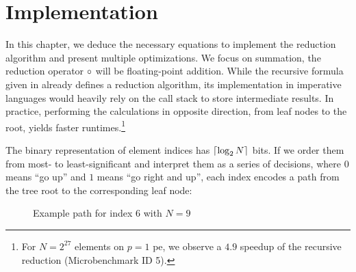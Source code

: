 \chapter{Implementation}
\label{ch:Implementation}

In this chapter, we deduce the necessary equations to implement the reduction algorithm and present multiple optimizations.
We focus on summation, the reduction operator $\operatorname{\circ}$ will be floating-point addition.
While the recursive formula given in  already defines a reduction algorithm, its implementation in imperative languages would heavily rely on the call stack to store intermediate results.
In practice, performing the calculations in opposite direction, from leaf nodes to the root, yields faster runtimes.\footnote{For $N=2^{27}$ elements on $p=1$ \gls{pe}, we observe a $4.9$ speedup of the recursive reduction (Microbenchmark ID 5).}

The binary representation of element indices has $\lceil \log_2 N \rceil$ bits.
If we order them from most- to least-significant and interpret them as a series of decisions, where $0$ means \enquote{go up} and $1$ means \enquote{go right and up}, each index encodes a path from the tree root to the corresponding leaf node:

\begin{figure}[H]
\centering
{}
\caption{Example path for index $6$ with $N = 9$}
\label{fig:indexTreePath}
\end{figure}

